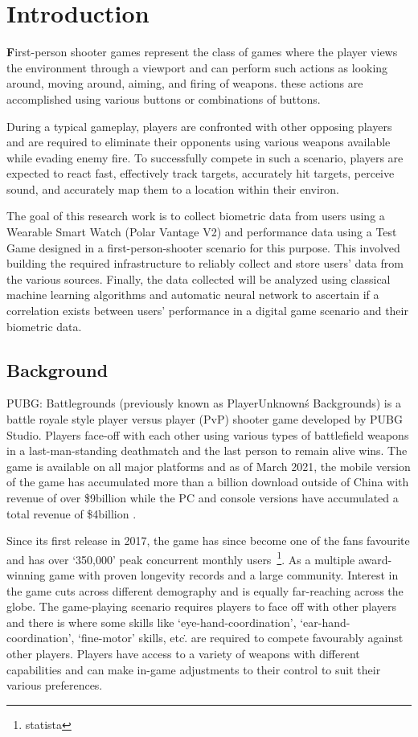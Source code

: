 \chapter{Introduction}

\textbf{F}irst-person shooter games represent the class of games where the player views the environment through a viewport
and can perform such actions as looking around, moving around, aiming, and firing of weapons. these actions are accomplished
using various buttons or combinations of buttons.

During a typical gameplay, players are confronted with other opposing players and are required to eliminate their opponents
using various weapons available while evading enemy fire. To successfully compete in such a scenario, players are expected to
react fast, effectively track targets, accurately hit targets, perceive sound, and accurately map them to a location within
their environ.

The goal of this research work is to collect biometric data from users using a Wearable Smart Watch (Polar Vantage V2)
and performance data using a Test Game designed in a first-person-shooter scenario for this purpose. This involved building
the required infrastructure to reliably collect and store users' data from the various sources. Finally, the data collected will be
analyzed using classical machine learning algorithms and automatic neural network to ascertain if a correlation exists between
users' performance in a digital game scenario and their biometric data.


\section{Background}
PUBG: Battlegrounds (previously known as PlayerUnknown\'s Backgrounds) is a battle royale style player versus
player (PvP) shooter game developed by PUBG Studio. Players face-off with each other using various types of battlefield weapons
in a last-man-standing deathmatch and the last person to remain alive wins. The game is available on all major platforms
and as of March 2021, the mobile version of the game has accumulated more than a billion download outside of China with
revenue of over \$9billion while the PC and console versions have accumulated a total revenue of \$4billion
\cite{statista}.
\par
Since its first release in 2017, the game has since become one of the fans favourite and has over `350,000' peak concurrent
monthly users~\footnote{statista}. As a multiple award-winning game with proven longevity records and a large community.
Interest in the game cuts across different demography and is equally far-reaching across the globe.
The game-playing scenario requires players to face off with other players and there is where some skills like
`eye-hand-coordination', `ear-hand-coordination', `fine-motor' skills, etc\.. are required to compete favourably against
other players. Players have access to a variety of weapons with different capabilities and can make in-game adjustments
to their control to suit their various preferences.


